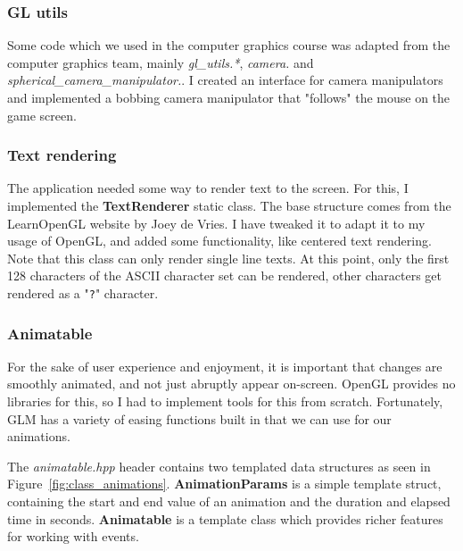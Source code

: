 \subsubsection*{GL utils}

Some code which we used in the computer graphics course was adapted from the computer graphics team, mainly \textit{gl\_utils.*}, \textit{camera.\*} and \textit{spherical\_camera\_manipulator.\*}. I created an interface for camera manipulators and implemented a bobbing camera manipulator that "follows" the mouse on the game screen.

\subsubsection*{Text rendering}

The application needed some way to render text to the screen. For this, I implemented the \textbf{TextRenderer} static class. The base structure comes from the LearnOpenGL website by Joey de Vries\cite{learnopengl}. I have tweaked it to adapt it to my usage of OpenGL, and added some functionality, like centered text rendering. Note that this class can only render single line texts. At this point, only the first 128 characters of the ASCII character set can be rendered, other characters get rendered as a "\texttt{?}" character.

\subsubsection*{Animatable}

For the sake of user experience and enjoyment, it is important that changes are smoothly animated, and not just abruptly appear on-screen. OpenGL provides no libraries for this, so I had to implement tools for this from scratch. Fortunately, GLM has a variety of easing functions\cite{ease} built in that we can use for our animations.

The \textit{animatable.hpp} header contains two templated data structures as seen in Figure~\ref{fig:class_animations}. \textbf{AnimationParams} is a simple template struct, containing the start and end value of an animation and the duration and elapsed time in seconds. \textbf{Animatable} is a template class which provides richer features for working with events.

